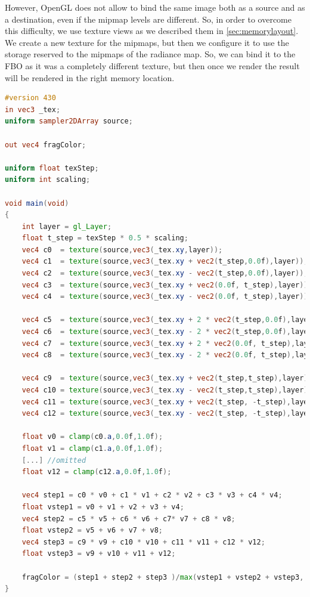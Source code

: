 However, OpenGL does not allow to bind the same image both as a source and as a destination, even if the mipmap levels are different. So, in order to overcome this difficulty, we use texture views as we described them in \ref{sec:memorylayout}. We create a new texture for the mipmaps, but then we configure it to use the storage reserved to the mipmaps of the radiance map. So, we can bind it to the FBO as it was a completely different texture, but then once we render the result will be rendered in the right memory location. 

\begin{lstlisting}[language=GLSL,label=lst:shaderimageprocessing,caption={Custom mipmap filtering on GPU. \gl{_tex} are the texture coordinates on the screen aligned quad.}]
#version 430
in vec3 _tex;
uniform sampler2DArray source;

out vec4 fragColor;

uniform float texStep;
uniform int scaling;

void main(void)
{
	int layer = gl_Layer;
	float t_step = texStep * 0.5 * scaling;
	vec4 c0  = texture(source,vec3(_tex.xy,layer));
	vec4 c1  = texture(source,vec3(_tex.xy + vec2(t_step,0.0f),layer));
	vec4 c2  = texture(source,vec3(_tex.xy - vec2(t_step,0.0f),layer));
	vec4 c3  = texture(source,vec3(_tex.xy + vec2(0.0f, t_step),layer));
	vec4 c4  = texture(source,vec3(_tex.xy - vec2(0.0f, t_step),layer));

	vec4 c5  = texture(source,vec3(_tex.xy + 2 * vec2(t_step,0.0f),layer));
	vec4 c6  = texture(source,vec3(_tex.xy - 2 * vec2(t_step,0.0f),layer));
	vec4 c7  = texture(source,vec3(_tex.xy + 2 * vec2(0.0f, t_step),layer));
	vec4 c8  = texture(source,vec3(_tex.xy - 2 * vec2(0.0f, t_step),layer));

	vec4 c9  = texture(source,vec3(_tex.xy + vec2(t_step,t_step),layer));
	vec4 c10 = texture(source,vec3(_tex.xy - vec2(t_step,t_step),layer));
	vec4 c11 = texture(source,vec3(_tex.xy + vec2(t_step, -t_step),layer));
	vec4 c12 = texture(source,vec3(_tex.xy - vec2(t_step, -t_step),layer));

	float v0 = clamp(c0.a,0.0f,1.0f);
	float v1 = clamp(c1.a,0.0f,1.0f);
	[...] //omitted
	float v12 = clamp(c12.a,0.0f,1.0f);

	vec4 step1 = c0 * v0 + c1 * v1 + c2 * v2 + c3 * v3 + c4 * v4;
	float vstep1 = v0 + v1 + v2 + v3 + v4;
	vec4 step2 = c5 * v5 + c6 * v6 + c7* v7 + c8 * v8;
	float vstep2 = v5 + v6 + v7 + v8;
	vec4 step3 = c9 * v9 + c10 * v10 + c11 * v11 + c12 * v12;
	float vstep3 = v9 + v10 + v11 + v12;

	fragColor = (step1 + step2 + step3 )/max(vstep1 + vstep2 + vstep3, 1.0f);
}
\end{lstlisting}

